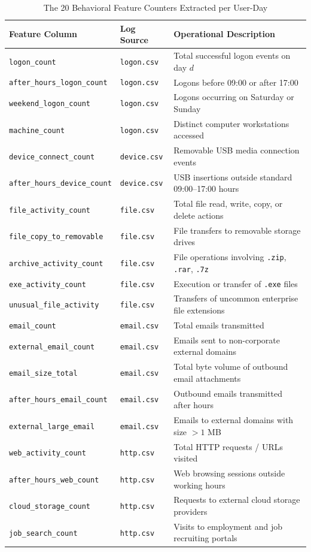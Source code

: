 \documentclass[12pt,a4paper]{report}
\begin{document}
\begin{table}[H]
\centering
\caption{The 20 Behavioral Feature Counters Extracted per User-Day}
\label{tab:counters}
\fontsize{9}{11}\selectfont
\begin{tabularx}{\textwidth}{lp{}X}
\toprule
\textbf{Feature Column} & \textbf{Log Source} & \textbf{Operational Description} \\
\midrule
\texttt{logon\_count} & \texttt{logon.csv} & Total successful logon events on day $d$ \\
\texttt{after\_hours\_logon\_count} & \texttt{logon.csv} & Logons before 09:00 or after 17:00 \\
\texttt{weekend\_logon\_count} & \texttt{logon.csv} & Logons occurring on Saturday or Sunday \\
\texttt{machine\_count} & \texttt{logon.csv} & Distinct computer workstations accessed \\
\texttt{device\_connect\_count} & \texttt{device.csv} & Removable USB media connection events \\
\texttt{after\_hours\_device\_count} & \texttt{device.csv} & USB insertions outside standard 09:00--17:00 hours \\
\texttt{file\_activity\_count} & \texttt{file.csv} & Total file read, write, copy, or delete actions \\
\texttt{file\_copy\_to\_removable} & \texttt{file.csv} & File transfers to removable storage drives \\
\texttt{archive\_activity\_count} & \texttt{file.csv} & File operations involving \texttt{.zip}, \texttt{.rar}, \texttt{.7z} \\
\texttt{exe\_activity\_count} & \texttt{file.csv} & Execution or transfer of \texttt{.exe} files \\
\texttt{unusual\_file\_activity} & \texttt{file.csv} & Transfers of uncommon enterprise file extensions \\
\texttt{email\_count} & \texttt{email.csv} & Total emails transmitted \\
\texttt{external\_email\_count} & \texttt{email.csv} & Emails sent to non-corporate external domains \\
\texttt{email\_size\_total} & \texttt{email.csv} & Total byte volume of outbound email attachments \\
\texttt{after\_hours\_email\_count} & \texttt{email.csv} & Outbound emails transmitted after hours \\
\texttt{external\_large\_email} & \texttt{email.csv} & Emails to external domains with size $> 1$ MB \\
\texttt{web\_activity\_count} & \texttt{http.csv} & Total HTTP requests / URLs visited \\
\texttt{after\_hours\_web\_count} & \texttt{http.csv} & Web browsing sessions outside working hours \\
\texttt{cloud\_storage\_count} & \texttt{http.csv} & Requests to external cloud storage providers \\
\texttt{job\_search\_count} & \texttt{http.csv} & Visits to employment and job recruiting portals \\
\bottomrule
\end{tabularx}
\end{table}
\end{document}
